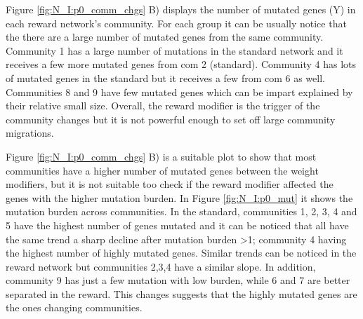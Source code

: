 Figure \ref{fig:N_I:p0_comm_chgs} B) displays the number of mutated genes (Y) in each reward network's community. For each group it can be usually notice that the there are a large number of mutated genes from the same community. Community 1 has a large number of mutations in the standard network and it receives a few more mutated genes from com 2 (standard). Community 4 has lots of mutated genes in the standard but it receives a few from com 6 as well. Communities 8 and 9 have few mutated genes which can be impart explained by their relative small size. Overall, the reward modifier is the trigger of the community changes but it is not powerful enough to set off large community migrations.

% 
Figure \ref{fig:N_I:p0_comm_chgs} B) is a suitable plot to show that most communities have a higher number of mutated genes between the weight modifiers, but it is not suitable too check if the reward modifier affected the genes with the higher mutation burden. In Figure \ref{fig:N_I:p0_mut}
it shows the mutation burden across communities. In the standard, communities 1, 2, 3, 4 and 5 have the highest number of genes mutated and it can be noticed that all have the same trend a sharp decline after mutation burden >1; community 4 having the highest number of highly mutated genes. Similar trends can be noticed in the reward network but communities 2,3,4 have a similar slope. In addition, community 9 has just a few mutation with low burden, while 6 and 7 are better separated in the reward. This changes suggests that the highly mutated genes are the ones changing communities.



